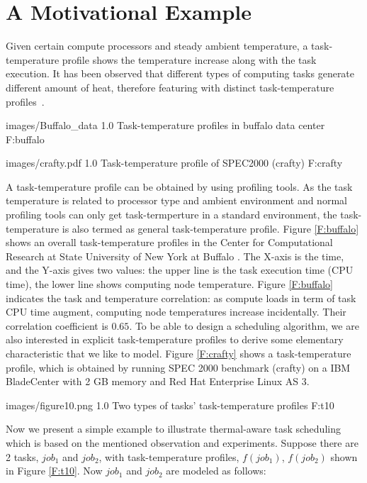  
\section{A Motivational Example}

Given certain compute processors and steady ambient  temperature, a task-temperature profile shows the temperature increase along with the task execution. 
It has been observed that different types of computing tasks generate different amount of heat, 
therefore featuring with distinct task-temperature profiles~\cite{DBLP:conf/aPcsac/VandersterBD07}. 

 {images/Buffalo_data}
  {1.0}
 {Task-temperature profiles in buffalo data center}
 {F:buffalo}

 {images/crafty.pdf}
  {1.0}
 { Task-temperature profile of SPEC2000 (crafty)}
 {F:crafty}
 

A task-temperature profile can be obtained by using profiling tools. 
As the task temperature is related to processor type and ambient environment and normal profiling tools 
can only get task-termperture in a standard environment, 
the task-temperature is also termed as general task-temperature profile. 
Figure \ref{F:buffalo} shows an overall task-temperature profiles in the Center for Computational Research at State University of New York at Buffalo \cite{www-ccr}. 
The X-axis is the time,  and the Y-axis gives two values: the upper line is the task execution time (CPU time), the lower line shows computing node temperature. 
Figure \ref{F:buffalo} indicates the task and temperature correlation: as compute loads in term of task CPU time augment, computing node temperatures increase incidentally. 
Their correlation coefficient is $0.65$. To be able to design a scheduling algorithm, we are also interested in explicit task-temperature profiles to derive some elementary characteristic that we like to model. Figure \ref{F:crafty} \cite{DBLP:conf/aPcsac/VandersterBD07} shows a task-temperature profile, 
which is obtained  by running SPEC 2000 benchmark (crafty) on a IBM BladeCenter 
with 2 GB memory and Red Hat Enterprise Linux AS 3.

 {images/figure10.png}
  {1.0}
 {Two types of tasks' task-temperature profiles}
 {F:t10}

Now we present a simple example to illustrate thermal-aware task scheduling which is based on the mentioned observation and experiments. Suppose there are 2 tasks, $job_1$ and $job_2$, with task-temperature profiles, $f(job_1)$, $f(job_2)$ shown in Figure \ref{F:t10}.
Now $job_1$ and $job_2$ are modeled as follows:

